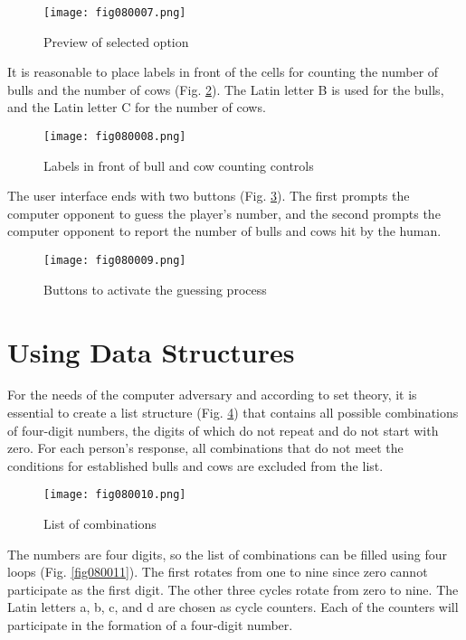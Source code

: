 \begin{figure}[H]
   \centering
   \texttt{[image: fig080007.png]}
   \caption{Preview of selected option}
\label{fig080007}
\end{figure}

It is reasonable to place labels in front of the cells for counting the number of bulls and the number of cows (Fig. \ref{fig080008}). The Latin letter B is used for the bulls, and the Latin letter C for the number of cows.

\begin{figure}[H]
   \centering
   \texttt{[image: fig080008.png]}
   \caption{Labels in front of bull and cow counting controls}
\label{fig080008}
\end{figure}

The user interface ends with two buttons (Fig. \ref{fig080009}). The first prompts the computer opponent to guess the player's number, and the second prompts the computer opponent to report the number of bulls and cows hit by the human.

\begin{figure}[H]
   \centering
   \texttt{[image: fig080009.png]}
   \caption{Buttons to activate the guessing process}
\label{fig080009}
\end{figure}

\section{Using Data Structures}

For the needs of the computer adversary and according to set theory, it is essential to create a list structure (Fig. \ref{fig080010}) that contains all possible combinations of four-digit numbers, the digits of which do not repeat and do not start with zero. For each person's response, all combinations that do not meet the conditions for established bulls and cows are excluded from the list.

\begin{figure}[H]
   \centering
   \texttt{[image: fig080010.png]}
   \caption{List of combinations}
\label{fig080010}
\end{figure}

The numbers are four digits, so the list of combinations can be filled using four loops (Fig. \ref{fig080011}). The first rotates from one to nine since zero cannot participate as the first digit. The other three cycles rotate from zero to nine. The Latin letters a, b, c, and d are chosen as cycle counters. Each of the counters will participate in the formation of a four-digit number.

